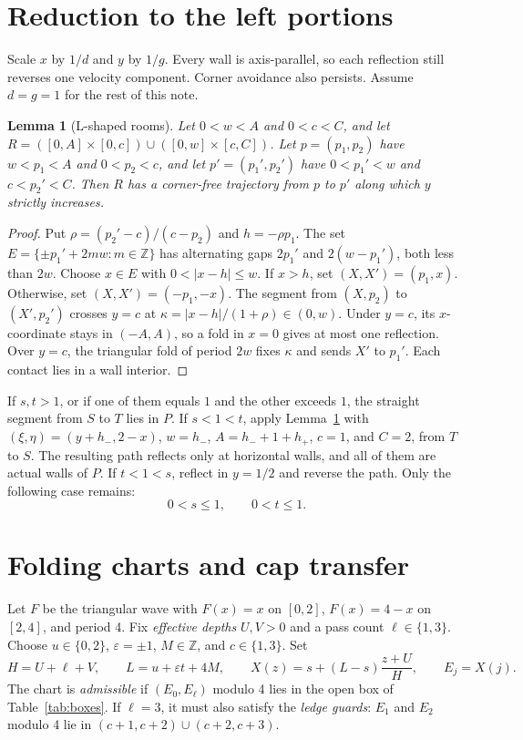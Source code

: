 \documentclass[11pt]{article}
\newtheorem{lemma}{Lemma}
\theoremstyle{remark}
\begin{document}
\section{Reduction to the left portions}\label{sec:reduction}
Scale $x$ by $1/d$ and $y$ by $1/g$. Every wall is axis-parallel, so each reflection still reverses one velocity component. Corner avoidance also persists. Assume $d=g=1$ for the rest of this note.

\begin{lemma}[L-shaped rooms]\label{lem:L}
Let $0<w<A$ and $0<c<C$, and let $R=([0,A]\times[0,c])\cup([0,w]\times[c,C])$. Let $p=(p_1,p_2)$ have $w<p_1<A$ and $0<p_2<c$, and let $p'=(p_1',p_2')$ have $0<p_1'<w$ and $c<p_2'<C$. Then $R$ has a corner-free trajectory from $p$ to $p'$ along which $y$ strictly increases.
\end{lemma}
\begin{proof}
Put $\rho=(p_2'-c)/(c-p_2)$ and $h=-\rho p_1$. The set $E=\{\pm p_1'+2mw:m\in\mathbb{Z}\}$ has alternating gaps $2p_1'$ and $2(w-p_1')$, both less than $2w$. Choose $x\in E$ with $0<|x-h|\le w$. If $x>h$, set $(X,X')=(p_1,x)$. Otherwise, set $(X,X')=(-p_1,-x)$. The segment from $(X,p_2)$ to $(X',p_2')$ crosses $y=c$ at $\kappa=|x-h|/(1+\rho)\in(0,w)$. Under $y=c$, its $x$-coordinate stays in $(-A,A)$, so a fold in $x=0$ gives at most one reflection. Over $y=c$, the triangular fold of period $2w$ fixes $\kappa$ and sends $X'$ to $p_1'$. Each contact lies in a wall interior.
\end{proof}

If $s,t>1$, or if one of them equals $1$ and the other exceeds $1$, the straight segment from $S$ to $T$ lies in $P$. If $s<1<t$, apply Lemma~\ref{lem:L} with $(\xi,\eta)=(y+h_-,2-x)$, $w=h_-$, $A=h_-+1+h_+$, $c=1$, and $C=2$, from $T$ to $S$. The resulting path reflects only at horizontal walls, and all of them are actual walls of $P$. If $t<1<s$, reflect in $y=1/2$ and reverse the path. Only the following case remains:
\begin{equation}\label{eq:domain}
0<s\le 1,\qquad 0<t\le 1.
\end{equation}

\section{Folding charts and cap transfer}\label{sec:charts}
Let $F$ be the triangular wave with $F(x)=x$ on $[0,2]$, $F(x)=4-x$ on $[2,4]$, and period 4. Fix \emph{effective depths} $U,V>0$ and a pass count $\ell\in\{1,3\}$. Choose $u\in\{0,2\}$, $\varepsilon=\pm1$, $M\in\mathbb{Z}$, and $c\in\{1,3\}$. Set
\begin{equation}\label{eq:line}
H=U+\ell+V,\qquad L=u+\varepsilon t+4M,\qquad X(z)=s+(L-s)\frac{z+U}{H},\qquad E_j=X(j).
\end{equation}
The chart is \emph{admissible} if $(E_0,E_\ell)$ modulo 4 lies in the open box of Table~\ref{tab:boxes}. If $\ell=3$, it must also satisfy the \emph{ledge guards}: $E_1$ and $E_2$ modulo 4 lie in $(c+1,c+2)\cup(c+2,c+3)$.
\end{document}
